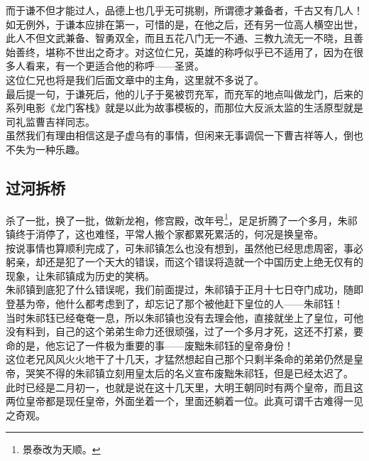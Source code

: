 \begin{multicols}{\theparacolNo}
而于谦不但才能过人，品德上也几乎无可挑剔，所谓德才兼备者，千古又有几人！\\

如无例外，于谦本应排在第一，可惜的是，在他之后，还有另一位高人横空出世，此人不但文武兼备、智勇双全，而且五花八门无一不通、三教九流无一不晓，且善始善终，堪称不世出之奇才。对这位仁兄，英雄的称呼似乎已不适用了，因为在很多人看来，有一个更适合他的称呼——圣贤。\\

这位仁兄也将是我们后面文章中的主角，这里就不多说了。\\

最后提一句，于谦死后，他的儿子于冕被罚充军，而充军的地点叫做龙门，后来的系列电影《龙门客栈》就是以此为故事模板的，而那位大反派太监的生活原型就是司礼监曹吉祥同志。\\

虽然我们有理由相信这是子虚乌有的事情，但闲来无事调侃一下曹吉祥等人，倒也不失为一种乐趣。\\

\subsection{过河拆桥}
杀了一批，换了一批，做新龙袍，修宫殿，改年号\footnote{景泰改为天顺。}，足足折腾了一个多月，朱祁镇终于消停了，这也难怪，平常人搬个家都累死累活的，何况是换皇帝。\\

按说事情也算顺利完成了，可朱祁镇怎么也没有想到，虽然他已经思虑周密，事必躬亲，却还是犯了一个天大的错误，而这个错误将造就一个中国历史上绝无仅有的现象，让朱祁镇成为历史的笑柄。\\

朱祁镇到底犯了什么错误呢，我们前面提过，朱祁镇于正月十七日夺门成功，随即登基为帝，他什么都考虑到了，却忘记了那个被他赶下皇位的人——朱祁钰！\\

当时朱祁钰已经奄奄一息，所以朱祁镇也没有去理会他，直接就坐上了皇位，可他没有料到，自己的这个弟弟生命力还很顽强，过了一个多月才死，这还不打紧，要命的是，他忘记了一件极为重要的事——废黜朱祁钰的皇帝身份！\\

这位老兄风风火火地干了十几天，才猛然想起自己那个只剩半条命的弟弟仍然是皇帝，哭笑不得的朱祁镇立刻用皇太后的名义宣布废黜朱祁钰，但是已经太迟了。\\

此时已经是二月初一，也就是说在这十几天里，大明王朝同时有两个皇帝，而且这两位皇帝都是现任皇帝，外面坐着一个，里面还躺着一位。此真可谓千古难得一见之奇观。\\


\end{multicols}
